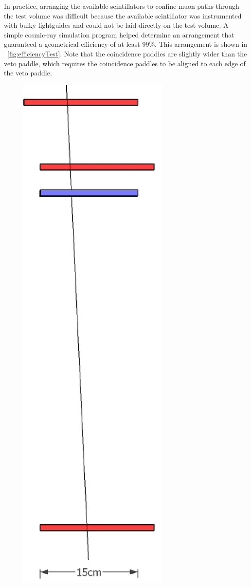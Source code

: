 In practice, arranging the available scintillators to confine muon paths through the test volume was difficult because the available scintillator was instrumented with bulky lightguides and could not be laid directly on the test volume.  A simple cosmic-ray simulation program helped determine an arrangement that guaranteed a geometrical efficiency of at least 99\%.  This arrangement is shown in {\fig}~\ref{fig:efficiencyTest}.  Note that the coincidence paddles are slightly wider than the veto paddle, which requires the coincidence paddles to be aligned to each edge of the veto paddle.  
\begin{figure}[!htbp]
\centering
\includegraphics[height=0.7\textheight]{figures/veto_test.eps}

\end{figure}

